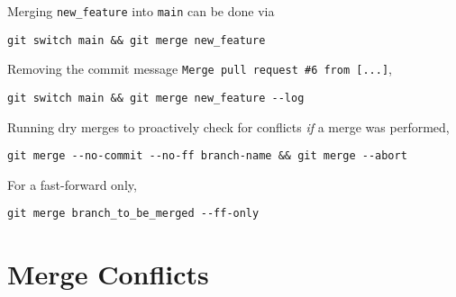 \documentclass[12pt, a4paper]{scrbook}
\numberwithin{equation}{section}
\theoremstyle{definition}
\theoremstyle{definition}
\begin{document}
		Merging \texttt{new\_feature} into \texttt{main} can be done via
		
		\begin{lstlisting}[style=mystylebash, label=alg:merging1, xleftmargin=\parindent]
			git switch main && git merge new_feature 
		\end{lstlisting}
		
		Removing the commit message \texttt{Merge pull request \#6 from [...]},
		
		\begin{lstlisting}[style=mystylebash, label=alg:merging2, xleftmargin=\parindent]
			git switch main && git merge new_feature --log
		\end{lstlisting}
	
		Running dry merges to proactively check for conflicts \textit{if} a merge was performed,
		
		\begin{lstlisting}[style=mystylebash, label=alg:git__dry_merge, xleftmargin=\parindent]
			git merge --no-commit --no-ff branch-name && git merge --abort
		\end{lstlisting}
		
		For a fast-forward only,
		
		\begin{lstlisting}[style=mystylebash, label=alg:git__ff_only, xleftmargin=\parindent]
			git merge branch_to_be_merged --ff-only
		\end{lstlisting}
	
	
	\section{Merge Conflicts}
	
\end{document}
